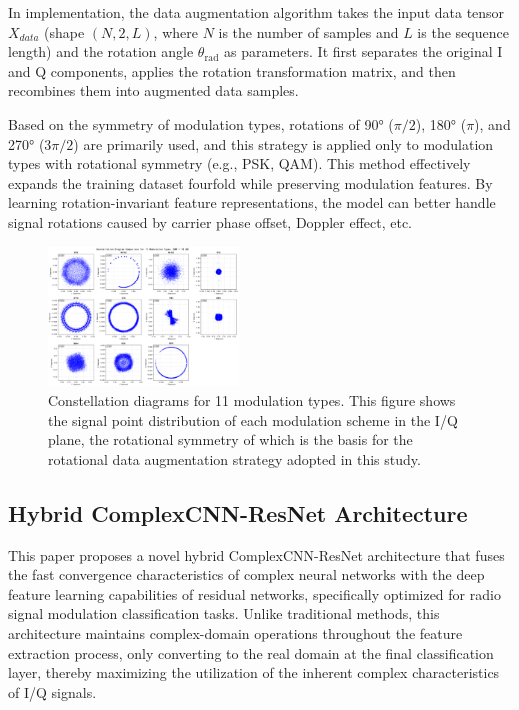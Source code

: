 \documentclass[conference]{IEEEtran}
\begin{document}
In implementation, the data augmentation algorithm takes the input data tensor \(X_{data}\) (shape \((N, 2, L)\), where \(N\) is the number of samples and \(L\) is the sequence length) and the rotation angle \(\theta_{\text{rad}}\) as parameters. It first separates the original I and Q components, applies the rotation transformation matrix, and then recombines them into augmented data samples.

Based on the symmetry of modulation types, rotations of 90° (\(\pi/2\)), 180° (\(\pi\)), and 270° (\(3\pi/2\)) are primarily used, and this strategy is applied only to modulation types with rotational symmetry (e.g., PSK, QAM). This method effectively expands the training dataset fourfold while preserving modulation features. By learning rotation-invariant feature representations, the model can better handle signal rotations caused by carrier phase offset, Doppler effect, etc.

\begin{figure}[htbp]
\centering
\includegraphics[width=0.45\textwidth]{figure/constellation.png}
\caption{Constellation diagrams for 11 modulation types. This figure shows the signal point distribution of each modulation scheme in the I/Q plane, the rotational symmetry of which is the basis for the rotational data augmentation strategy adopted in this study.}
\label{fig:constellation}
\end{figure}

\subsection{Hybrid ComplexCNN-ResNet Architecture}

This paper proposes a novel hybrid ComplexCNN-ResNet architecture that fuses the fast convergence characteristics of complex neural networks with the deep feature learning capabilities of residual networks, specifically optimized for radio signal modulation classification tasks. Unlike traditional methods, this architecture maintains complex-domain operations throughout the feature extraction process, only converting to the real domain at the final classification layer, thereby maximizing the utilization of the inherent complex characteristics of I/Q signals.
\end{document}
